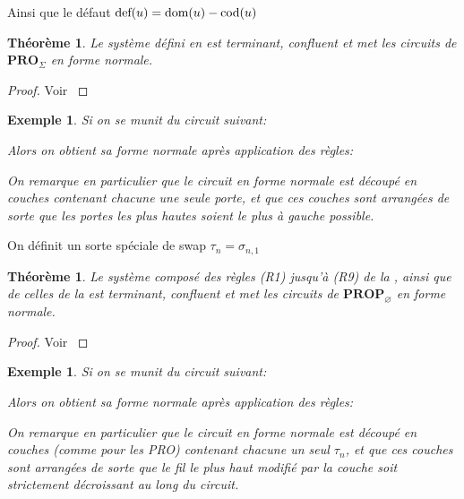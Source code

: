 \documentclass[12pt, a4paper]{article}
\newtheorem{theorem}[definition]{Théorème}
\newtheorem{example}[definition]{Exemple}
\newcommand{\smallinput}[1]{\scalebox{0.75}{}}
\def\pro#1{ \mathbf{PRO}_{ #1 } }
\def\prop#1{ \mathbf{PROP}_{ #1 } }
\begin{document}
Ainsi que le défaut $\textup{def}(u) = \textup{dom}(u) - \textup{cod}(u)$


\begin{theorem}
    Le système défini en \hyperref[fig:pro_rws]{} est terminant, confluent et met les circuits de $\pro{\Sigma}$ en forme normale.
\end{theorem}
\begin{proof}
    Voir \cite{terms}
\end{proof}


\begin{example}
    Si on se munit du circuit suivant:

    \begin{center}
        \smallinput{ex/nf_pro_right.tikz}
    \end{center}
    
    Alors on obtient sa forme normale après application des règles:

    \begin{center}
        \smallinput{ex/nf_pro_left.tikz}
    \end{center}

    On remarque en particulier que le circuit en forme normale est découpé en couches contenant chacune une seule porte, et que ces couches sont arrangées de sorte que les portes les plus hautes soient le plus à gauche possible.
\end{example}

\bigskip

On définit un sorte spéciale de swap $\tau_n = \sigma_{n,1}$

\begin{theorem}
    Le système composé des règles (R1) jusqu'à (R9) de la \hyperref[fig:pro_rws]{}, ainsi que de celles de la \hyperref[fig:perm_rws]{} est terminant, confluent et met les circuits de $\prop{\varnothing}$ en forme normale.
\end{theorem}
\begin{proof}
    Voir \cite{terms}
\end{proof}


\begin{example}
    Si on se munit du circuit suivant:

    \begin{center}
        \smallinput{ex/nf_perm_left.tikz}
    \end{center}

    Alors on obtient sa forme normale après application des règles:

    \begin{center}
        \smallinput{ex/nf_perm_right.tikz}
    \end{center}

    On remarque en particulier que le circuit en forme normale est découpé en couches (comme pour les PRO) contenant chacune un seul $\tau_n$, et que ces couches sont arrangées de sorte que le fil le plus haut modifié par la couche soit strictement décroissant au long du circuit.
\end{example}
\end{document}
